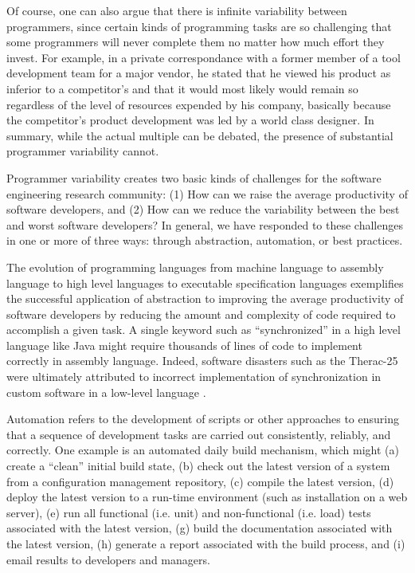 Of course, one can also argue that there is infinite variability between
programmers, since certain kinds of programming tasks are so challenging
that some programmers will never complete them no matter how much effort
they invest. For example, in a private correspondance with a former member
of a tool development team for a major vendor, he stated that he viewed his
product as inferior to a competitor's and that it would most likely would
remain so regardless of the level of resources expended by his company,
basically because the competitor's product development was led by a world
class designer.  In summary, while the actual multiple can be debated, the
presence of substantial programmer variability cannot.


Programmer variability creates two basic kinds of challenges for the
software engineering research community: (1) How can we raise the average
productivity of software developers, and (2) How can we reduce the
variability between the best and worst software developers?  In general, we
have responded to these challenges in one or more of three ways: through
abstraction, automation, or best practices.

The evolution of programming languages from machine language to assembly
language to high level languages to executable specification languages
exemplifies the successful application of abstraction to improving the
average productivity of software developers by reducing the amount and
complexity of code required to accomplish a given task.  A single keyword
such as ``synchronized'' in a high level language like Java might require
thousands of lines of code to implement correctly in assembly language.
Indeed, software disasters such as the Therac-25 were ultimately
attributed to incorrect implementation of synchronization in custom
software in a low-level language \cite{Leveson93}.

Automation refers to the development of scripts or other approaches to
ensuring that a sequence of development tasks are carried out consistently,
reliably, and correctly.  One example is an automated daily build
mechanism, which might (a) create a ``clean'' initial build state, (b)
check out the latest version of a system from a configuration management
repository, (c) compile the latest version, (d) deploy the latest version
to a run-time environment (such as installation on a web server), (e) run
all functional (i.e. unit) and non-functional (i.e. load) tests associated
with the latest version, (g) build the documentation associated with the
latest version, (h) generate a report associated with the build process,
and (i) email results to developers and managers.  

